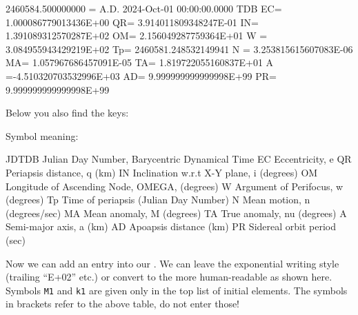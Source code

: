 \begin{configfile}[\scriptsize]
2460584.500000000 = A.D. 2024-Oct-01 00:00:00.0000 TDB 
 EC= 1.000086779013436E+00 QR= 3.914011809348247E-01 IN= 1.391089312570287E+02
 OM= 2.156049287759364E+01 W = 3.084955943429219E+02 Tp=  2460581.248532149941
 N = 3.253815615607083E-06 MA= 1.057967686457091E-05 TA= 1.819722055160837E+01
 A =-4.510320703532996E+03 AD= 9.999999999999998E+99 PR= 9.999999999999998E+99
\end{configfile}
Below you also find the keys:

\begin{configfile}
   Symbol meaning:

    JDTDB    Julian Day Number, Barycentric Dynamical Time
      EC     Eccentricity, e
      QR     Periapsis distance, q (km)
      IN     Inclination w.r.t X-Y plane, i (degrees)
      OM     Longitude of Ascending Node, OMEGA, (degrees)
      W      Argument of Perifocus, w (degrees)
      Tp     Time of periapsis (Julian Day Number)
      N      Mean motion, n (degrees/sec)
      MA     Mean anomaly, M (degrees)
      TA     True anomaly, nu (degrees)
      A      Semi-major axis, a (km)
      AD     Apoapsis distance (km)
      PR     Sidereal orbit period (sec)
\end{configfile} 
 
\noindent Now we can add an entry into our . 
We can leave the exponential writing style (trailing ``E+02'' etc.) 
or convert to the more human-readable as shown here. 
Symbols \texttt{M1} and \texttt{k1} are given only in the top list of initial elements. 
The symbols in brackets refer to the above table, do not enter those!



